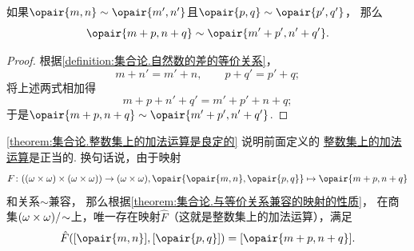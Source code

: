 \begin{lemma}\label{theorem:集合论.整数集上的加法运算是良定的}
如果\(\opair{m,n}\sim\opair{m',n'}\)且\(\opair{p,q}\sim\opair{p',q'}\)，
那么\begin{equation*}
	\opair{m+p,n+q}\sim\opair{m'+p',n'+q'}.
\end{equation*}
\begin{proof}
根据\cref{definition:集合论.自然数的差的等价关系}，
\begin{equation*}
	m+n'=m'+n, \qquad
	p+q'=p'+q;
\end{equation*}
将上述两式相加得\begin{equation*}
	m+p+n'+q'=m'+p'+n+q;
\end{equation*}
于是\(\opair{m+p,n+q}\sim\opair{m'+p',n'+q'}\).
\end{proof}
\end{lemma}
\cref{theorem:集合论.整数集上的加法运算是良定的} 说明前面定义的%
\hyperref[equation:集合论.整数集上的加法运算]{整数集上的加法运算}是正当的.
换句话说，由于映射\begin{equation*}
	F\colon ((\omega\times\omega)\times(\omega\times\omega))\to(\omega\times\omega),
	\opair{\opair{m,n},\opair{p,q}} \mapsto \opair{m+p,n+q}
\end{equation*}和关系\(\sim\)兼容，
那么根据\cref{theorem:集合论.与等价关系兼容的映射的性质}，
在商集\((\omega\times\omega)/\kern-2pt\sim\)上，唯一存在映射\(\hat{F}\)（这就是整数集上的加法运算），满足\begin{equation*}
	\hat{F}(\EquivalenceClassB{\opair{m,n}}[\sim],\EquivalenceClassB{\opair{p,q}}[\sim]) = \EquivalenceClassB{\opair{m+p,n+q}}[\sim].
\end{equation*}

